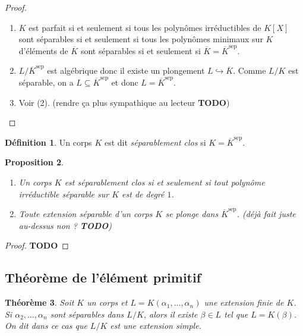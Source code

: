 \documentclass{article}
\newcommand{\sep}{\mathrm{sep}}
\newcommand{\todo}{\textbf{TODO}}
\theoremstyle{plain}
\newtheorem{theorem}{Théorème}[subsection]
\newtheorem{proposition}[theorem]{Proposition}
\theoremstyle{definition}
\newtheorem{definition}[theorem]{Définition}
\theoremstyle{remark}
\begin{document}
\begin{proof} \leavevmode
    \begin{enumerate}
        \item $K$ est parfait si et seulement si tous les polynômes irréductibles de $K[X]$ sont séparables si et seulement si tous les polynômes minimaux sur $K$ d'éléments de $\overline{K}$ sont séparables si et seulement si $\overline{K} = \overline{K}^\sep$.
        \item $L/\overline{K}^\sep$ est algébrique donc il existe un plongement $L\hookrightarrow \overline{K}$. Comme $L/K$ est séparable, on a $L \subseteq \overline{K}^\sep$ et donc $L = \overline{K}^\sep$.
        \item Voir (2). (rendre ça plus sympathique au lecteur \todo)
    \end{enumerate}
\end{proof}

\begin{definition}
    Un corps $K$ est dit \emph{séparablement clos} si $K = \overline{K}^\sep$.
\end{definition}

\begin{proposition} \leavevmode
    \begin{enumerate}
        \item Un corps $K$ est séparablement clos si et seulement si tout polynôme irréductible séparable sur $K$ est de degré $1$.
        \item Toute extension séparable d'un corps $K$ se plonge dans $\overline{K}^\sep$. (déjà fait juste au-dessus non ? \todo)
    \end{enumerate}
\end{proposition}

\begin{proof}
    \todo
\end{proof}

\subsection{Théorème de l'élément primitif}

\begin{theorem}
    Soit $K$ un corps et $L = K(\alpha_1,\dots,\alpha_n)$ une extension finie de $K$. Si $\alpha_2,\dots,\alpha_n$ sont séparables dans $L/K$, alors il existe $\beta \in L$ tel que $L = K(\beta)$. On dit dans ce cas que $L/K$ est une \emph{extension simple}.
\end{theorem}
\end{document}
